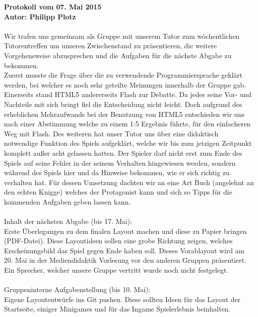 \documentclass[a4paper,10pt]{article}
\begin{document}
{\bfseries \large Protokoll vom 07. Mai 2015 \\[1mm]		%
\normalfont Autor: Philipp Plotz}					%

\paragraph{}
Wir trafen uns gemeinsam als Gruppe mit unserem Tutor zum wöchentlichen Tutorentreffen um unseren Zwischenstand zu präsentieren, die weitere Vorgehensweise abzusprechen und die Aufgaben für die nächste Abgabe zu bekommen.\\
Zuerst musste die Frage über die zu verwendende Programmiersprache geklärt werden, bei welcher es noch sehr geteilte Meinungen innerhalb der Gruppe gab. Einerseits stand HTML5 andererseits Flash zur Debatte. Da jedes seine Vor- und Nachteile mit sich bringt fiel die Entscheidung nicht leicht. Doch aufgrund des erheblichen Mehraufwands bei der Benutzung von HTML5 entschieden wir uns nach einer Abstimmung welche zu einem 1:5 Ergebnis führte, für den einfacheren Weg mit Flash. Des weiteren hat unser Tutor uns über eine didaktisch notwendige Funktion des Spiels aufgeklärt, welche wir bis zum jetzigen Zeitpunkt komplett außer acht gelassen hatten. Der Spieler darf nicht erst zum Ende des Spiels auf seine Fehler in der seinem Verhalten hingewiesen werden, sondern während des Spiels hier und da Hinweise bekommen, wie er sich richtig zu verhalten hat. Für dessen Umsetzung dachten wir an eine Art Buch (angelehnt an den echten Knigge) welches der Protagonist kann und sich so Tipps für die kommenden Aufgaben geben lassen kann.
\paragraph{}
Inhalt der nächsten Abgabe (bis 17. Mai):\\
Erste Überlegungen zu dem finalen Layout machen und diese zu Papier bringen (PDF-Datei). Diese Layoutideen sollen eine grobe Richtung zeigen, welches Erscheinungsbild das Spiel gegen Ende haben soll. Dieses Vorablayout wird am 20. Mai in der Mediendidaktik Vorlesung vor den anderen Gruppen präsentiert. Ein Sprecher, welcher unsere Gruppe vertritt wurde noch nicht festgelegt.
\paragraph{}
Gruppeninterne Aufgabenstellung (bis 10. Mai):\\
Eigene Layoutentwürfe ins Git pushen. Diese sollten Ideen für das Layout der Startseite, einiger Minigames und für das Ingame Spielerlebnis beinhalten.
\end{document}
